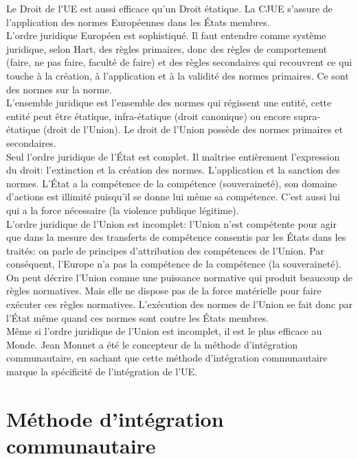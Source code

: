 \documentclass[12pt, a4paper, openany]{book}
\begin{document}
Le Droit de l'UE est aussi efficace qu'un Droit étatique. La CJUE s'assure de l'application des normes Européennes dans les États membres.  \\
L'ordre juridique Européen est sophistiqué. Il faut entendre comme système juridique, selon Hart, des règles primaires, donc des règles de comportement (faire, ne pas faire, faculté de faire) et des règles secondaires qui recouvrent ce qui touche à la création, à l'application et à la validité des normes primaires. Ce sont des normes sur la norme. \\
L'ensemble juridique est l'ensemble des normes qui régissent une entité, cette entité peut être étatique, infra-étatique (droit canonique) ou encore supra-étatique (droit de l'Union). Le droit de l'Union possède des normes primaires et secondaires. \\
Seul l'ordre juridique de l'État est complet. Il maîtrise entièrement l'expression du droit: l'extinction et la création des normes. L'application et la sanction des normes. L'État a la compétence de la compétence (souveraineté), son domaine d'actions est illimité puisqu'il se donne lui même sa compétence. C'est aussi lui qui a la force nécessaire (la violence publique légitime). \\
L'ordre juridique de l'Union est incomplet: l'Union n'est compétente pour agir que dans la mesure des transferts de compétence consentis par les États dans les traités: on parle de principes d'attribution des compétences de l'Union. Par conséquent, l'Europe n'a pas la compétence de la compétence (la souveraineté). \\
On peut décrire l'Union comme une puissance normative qui produit beaucoup de règles normatives. Mais elle ne dispose pas de la force matérielle pour faire exécuter ces règles normatives. L'exécution des normes de l'Union se fait donc par l'État même quand ces normes sont contre les États membres. \\
Même si l'ordre juridique de l'Union est incomplet, il est le plus efficace au Monde. Jean Monnet a été le concepteur de la méthode d'intégration communautaire, en sachant que cette méthode d'intégration communautaire marque la spécificité de l'intégration de l'UE. 

\section{Méthode d'intégration communautaire}
\end{document}
